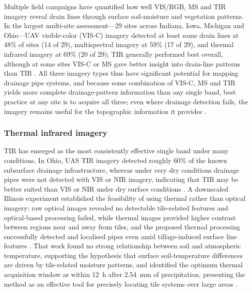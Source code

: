 Multiple field campaigns have quantified how well VIS/RGB, MS and TIR imagery reveal drain lines through surface soil-moisture and vegetation patterns. In the largest multi-site assessment---29 sites across Indiana, Iowa, Michigan and Ohio---UAV visible-color (VIS-C) imagery detected at least some drain lines at 48\% of sites (14 of 29), multispectral imagery at 59\% (17 of 29), and thermal infrared imagery at 69\% (20 of 29); TIR generally performed best overall, although at some sites VIS-C or MS gave better insight into drain-line patterns than TIR \parencite{Allred2020}. All three imagery types thus have significant potential for mapping drainage pipe systems, and because some combination of VIS-C, MS and TIR yields more complete drainage-pattern information than any single band, best practice at any site is to acquire all three; even where drainage detection fails, the imagery remains useful for the topographic information it provides \parencite{Allred2020}.

\subsubsection{Thermal infrared imagery}

TIR has emerged as the most consistently effective single band under many conditions. In Ohio, UAS TIR imagery detected roughly 60\% of the known subsurface drainage infrastructure, whereas under very dry conditions drainage pipes were not detected with VIS or NIR imagery, indicating that TIR may be better suited than VIS or NIR under dry surface conditions \parencite{Allred2018}. A downscaled Illinois experiment established the feasibility of using thermal rather than optical imagery: raw optical images revealed no detectable tile-related features and optical-based processing failed, while thermal images provided higher contrast between regions near and away from tiles, and the proposed thermal processing successfully detected and localised pipes even amid tillage-induced surface line features \parencite{Woo2019}. That work found no strong relationship between soil and atmospheric temperature, supporting the hypothesis that surface soil-temperature differences are driven by tile-related moisture patterns, and identified the optimum thermal acquisition window as within 12~h after 2.54~mm of precipitation, presenting the method as an effective tool for precisely locating tile systems over large areas \parencite{Woo2019}.

